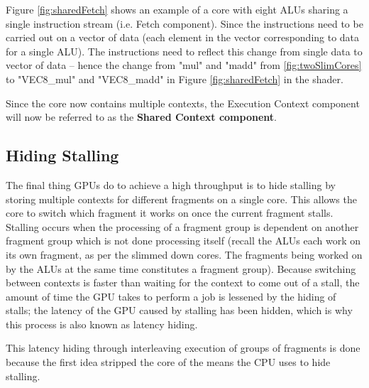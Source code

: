 
Figure \ref{fig:sharedFetch} shows an example of a core with eight \glspl{ALU} sharing a single instruction stream (i.e. Fetch component).
Since the instructions need to be carried out on a vector of data (each element in the vector corresponding to data for a single \gls{ALU}).
The instructions need to reflect this change from single data to vector of data -- hence the change from "mul" and "madd" from \ref{fig:twoSlimCores} to "VEC8\_mul" and "VEC8\_madd" in Figure \ref{fig:sharedFetch} in the shader.

Since the core now contains multiple contexts, the Execution Context component will now be referred to as the \textbf{Shared Context component}.

\subsection{Hiding Stalling}
The final thing \glspl{GPU} do to achieve a high throughput is to hide stalling by storing multiple contexts for different fragments on a single core. 
This allows the core to switch which fragment it works on once the current fragment stalls.
Stalling occurs when the processing of a fragment group is dependent on another fragment group which is not done processing itself (recall the \glspl{ALU} each work on its own fragment, as per the slimmed down cores.  The fragments being worked on by the \glspl{ALU} at the same time constitutes a fragment group).
Because switching between contexts is faster than waiting for the context to come out of a stall, the amount of time the \gls{GPU} takes to perform a job is lessened by the hiding of stalls; the latency of the \gls{GPU} caused by stalling has been hidden, which is why this process is also known as latency hiding.

This latency hiding through interleaving execution of groups of fragments is done because the first idea  stripped the core of the means the \gls{CPU} uses to hide stalling.



